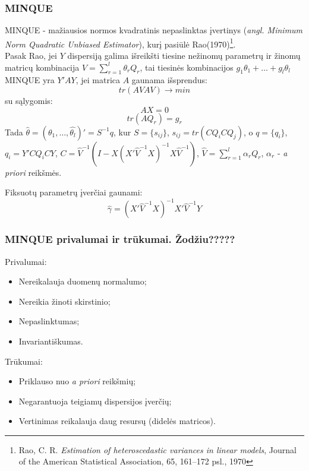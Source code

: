 \documentclass[utf8,hyperref={unicode,pdftex}]{beamer}
\begin{document}
\begin{frame}
\frametitle{MINQUE}
\begin{small}
\indent MINQUE - mažiausios normos kvadratinis nepaslinktas įvertinys (\textit{angl. Minimum Norm Quadratic Unbiased Estimator}), kurį pasiūlė Rao(1970)\footnote{Rao, C. R.  \textit{Estimation of heteroscedastic variances in linear models}, Journal of the American Statistical Association, 65, 161–172 psl., 1970}.\\
 

\indent Pasak Rao, jei $Y$ dispersiją galima išreikšti tiesine nežinomų parametrų ir žinomų matricų kombinacija $V= \sum^l_{r=1}\theta_r Q_r$, tai tiesinės kombinacijos $g_1 \theta_1+\dots+g_l \theta_l$ MINQUE yra $Y'AY$, jei matrica $A$ gaunama išsprendus:
\[tr(AVAV) \to min\]
su sąlygomis:
\[AX = 0\]
\[tr(AQ_r)=g_r\]
Tada $\hat{\theta} = (\hat{\theta_1},\dots,\hat{\theta_l})'=S^{-1}q$, kur $S=\{s_{ij}\}$, $s_{ij}=tr(CQ_iCQ_j)$, o
$q=\{q_i\}$, $q_i=Y'CQ_iCY$, $C = \hat{V}^{-1}(I-X(X' \hat{V}^{-1}X)^{-1}X \hat{V}^{-1})$, $\hat{V}=\sum^l_{r=1}\alpha_rQ_r$, $\alpha_r$ - \textit{a priori} reikšmės.

Fiksuotų parametrų įverčiai gaunami:
\[\hat{\gamma}=(X'\hat{V}^{-1}X)^{-1}X'\hat{V}^{-1}Y\]
\end{small}
\end{frame}
\begin{frame}
\frametitle{MINQUE privalumai ir trūkumai. Žodžiu?????}
Privalumai:
\begin{itemize}
\item Nereikalauja duomenų normalumo;
\item Nereikia žinoti skirstinio;
\item Nepaslinktumas;
\item Invariantiškumas.
\end{itemize}
Trūkumai:
\begin{itemize}
\item Priklauso nuo \textit{a priori} reikšmių;
\item Negarantuoja teigiamų dispersijos įverčių;
\item Vertinimas reikalauja daug resursų (didelės matricos).
\end{itemize}
\end{frame}
\end{document}
